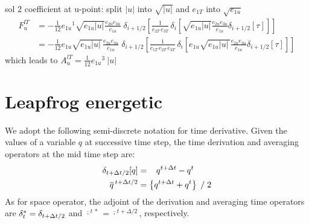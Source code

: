 \documentclass[../tex_main/NEMO_manual]{subfiles}
\begin{document}
sol 2 coefficient at u-point: split $|u|$ into $\sqrt{|u|}$ and $e_{1T}$ into $\sqrt{e_{1u}}$
\begin{equation} \label{eq:tra_adv_ubs2}
\begin{split}
F_u^{lT}
&= - \frac{1}{12} {e_{1u}}^1 \sqrt{e_{1u}|u|} \frac{e_{2u} e_{3u}}{e_{1u}}\;\delta_{i+1/2}\left[ \frac{1}{e_{2T}\,e_{3T}}\,\delta _i \left[ \sqrt{e_{1u}|u|} \frac{e_{2u} e_{3u} }{e_{1u} } \delta _{i+1/2}[\tau] \right] \right] \\
&= - \frac{1}{12} e_{1u} \sqrt{e_{1u}|u|\,} \frac{e_{2u} e_{3u}}{e_{1u}}\;\delta_{i+1/2}\left[ \frac{1}{e_{1T}\,e_{2T}\,e_{3T}}\,\delta _i \left[ e_{1u} \sqrt{e_{1u}|u|\,} \frac{e_{2u} e_{3u} }{e_{1u}} \delta _{i+1/2}[\tau] \right] \right]
\end{split}
\end{equation}
which leads to ${A_u^{lT}} = \frac{1}{12} {e_{1u}}^3\ |u|$


\section{Leapfrog energetic}
\label{sec:LF}

We adopt the following semi-discrete notation for time derivative.
Given the values of a variable $q$ at successive time step,
the time derivation and averaging operators at the mid time step are:
\begin{subequations} \label{eq:dt_mt}
\begin{align}
 \delta _{t+\Delta t/2} [q]     &=  \  \ \,   q^{t+\Delta t}  - q^{t}		\\
 \overline q^{\,t+\Delta t/2} &= \left\{ q^{t+\Delta t} + q^{t} \right\} \; / \; 2
\end{align}
\end{subequations}
As for space operator,
the adjoint of the derivation and averaging time operators are $\delta_t^*=\delta_{t+\Delta t/2}$ and
$\overline{\cdot}^{\,t\,*}= \overline{\cdot}^{\,t+\Delta/2}$, respectively.
\end{document}
